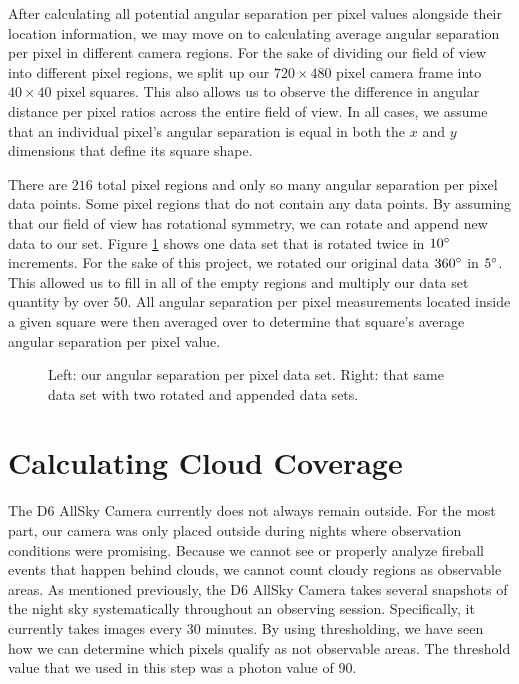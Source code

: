 After calculating all potential angular separation per pixel values alongside their location information, we may move on to calculating average angular separation per pixel in different camera regions.
For the sake of dividing our field of view into different pixel regions, we split up our $720 \times 480$ pixel camera frame into $40 \times 40$ pixel squares.
This also allows us to observe the difference in angular distance per pixel ratios across the entire field of view.
In all cases, we assume that an individual pixel's angular separation is equal in both the $x$ and $y$ dimensions that define its square shape.


There are $216$ total pixel regions and only so many angular separation per pixel data points.
Some pixel regions that do not contain any data points.
By assuming that our field of view has rotational symmetry, we can rotate and append new data to our set.
Figure \ref{rotate} shows one data set that is rotated twice in $10 \degree$ increments.
For the sake of this project, we rotated our original data $360 \degree$ in $5 \degree$.  
This allowed us to fill in all of the empty regions and multiply our data set quantity by over $50$.
All angular separation per pixel measurements located inside a given square were then averaged over to determine that square's average angular separation per pixel value.

\begin{figure}[h]
  \centering
  \caption{Left: our angular separation per pixel data set. Right: that same data set with two rotated and appended data sets.}
  \label{rotate}
\end{figure}

\section{Calculating Cloud Coverage}

The D6 AllSky Camera currently does not always remain outside.
For the most part, our camera was only placed outside during nights where observation conditions were promising.
Because we cannot see or properly analyze fireball events that happen behind clouds, we cannot count cloudy regions as observable areas.
As mentioned previously, the D6 AllSky Camera takes several snapshots of the night sky systematically throughout an observing session.
Specifically, it currently takes images every $30$ minutes.
By using thresholding, we have seen how we can determine which pixels qualify as not observable areas.
The threshold value that we used in this step was a photon value of $90$.


